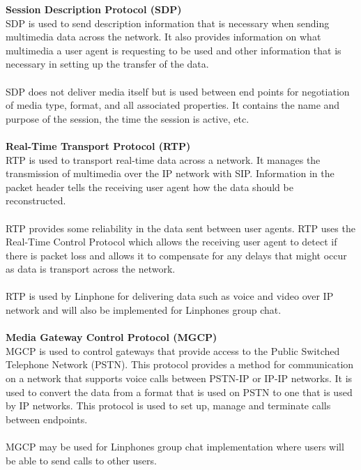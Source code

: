 \documentclass[a4paper]{article}
\begin{document}
\textbf{Session Description Protocol (SDP)\\}
SDP is used to send description information that is necessary when sending multimedia data across the network. It also provides information on what multimedia a user agent is requesting to be used and other information that is necessary in setting up the transfer of the data.\\
\\
SDP does not deliver media itself but is used between end points for negotiation of media type, format, and all associated properties. It contains the name and purpose of the session, the time the session is active, etc.\\
\\

\textbf{Real-Time Transport Protocol (RTP)\\}
RTP is used to transport real-time data across a network. It manages the transmission of multimedia over the IP network with SIP. Information in the packet header tells the receiving user agent how the data should be reconstructed. \\
\\
RTP provides some reliability in the data sent between user agents. RTP uses the Real-Time Control Protocol which allows the receiving user agent to detect if there is packet loss and allows it to compensate for any delays that might occur as data is transport across the network.\\
\\
RTP is used by Linphone for delivering data such as voice and video over IP network and will also be implemented for Linphones group chat.\\
\\

\textbf{Media Gateway Control Protocol (MGCP)\\}
MGCP is used to control gateways that provide access to the Public Switched Telephone Network (PSTN). This protocol provides a method for communication on a network that supports voice calls between PSTN-IP or IP-IP networks. It is used to convert the data from a format that is used on PSTN to one that is used by IP networks. This protocol is used to set up, manage and terminate calls between endpoints.\\
\\
MGCP may be used for Linphones group chat implementation where users will be able to send calls to other users.\\
\\
\end{document}
